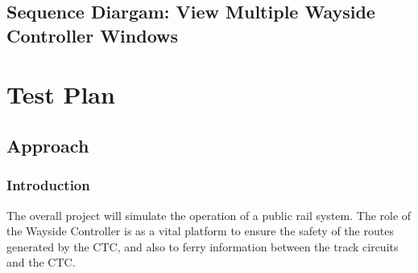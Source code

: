 \documentclass{scrreprt}
\begin{document}
    \subsection{Sequence Diargam: View Multiple Wayside Controller Windows}
    \begin{center}
    \end{center}


\providecommand{\test}[1]{\subsubsection{IDENTIFIER: #1}}
    \section{Test Plan}

        \subsection{Approach}

        \subsubsection{Introduction}
        The overall project will simulate the operation of a public rail system. The role of the Wayside Controller is as a vital platform to ensure the safety of the routes generated by the CTC, and also to ferry information between the track circuits and the CTC.
        
\end{document}
